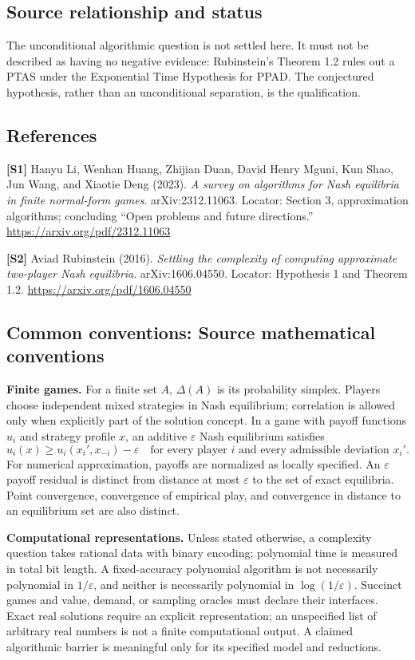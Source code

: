 \documentclass[11pt,a4paper]{article}
\begin{document}
\subsection*{Source relationship and status}
The unconditional algorithmic question is not settled here. It must not be described as having no negative evidence: Rubinstein's Theorem 1.2 rules out a PTAS under the Exponential Time Hypothesis for PPAD. The conjectured hypothesis, rather than an unconditional separation, is the qualification.
\subsection*{References}
\begingroup\footnotesize\raggedright
{\footnotesize\raggedright
\textbf{[S1]} Hanyu Li, Wenhan Huang, Zhijian Duan, David Henry Mguni, Kun Shao, Jun Wang, and Xiaotie Deng (2023). \emph{A survey on algorithms for Nash equilibria in finite normal-form games}. arXiv:2312.11063. Locator: Section 3, approximation algorithms; concluding ``Open problems and future directions.'' \url{https://arxiv.org/pdf/2312.11063}\par
\textbf{[S2]} Aviad Rubinstein (2016). \emph{Settling the complexity of computing approximate two-player Nash equilibria}. arXiv:1606.04550. Locator: Hypothesis 1 and Theorem 1.2. \url{https://arxiv.org/pdf/1606.04550}\par}
\par\endgroup

\subsection*{Common conventions: Source mathematical conventions}

\textbf{Finite games.} For a finite set $A$, $\Delta(A)$ is its probability
simplex. Players choose independent mixed strategies in Nash equilibrium;
correlation is allowed only when explicitly part of the solution concept.
In a game with payoff functions $u_i$ and strategy profile $x$, an additive
$\varepsilon$ Nash equilibrium satisfies
\[
 u_i(x)\geq u_i(x_i',x_{-i})-\varepsilon
 \quad\text{for every player $i$ and every admissible deviation $x_i'$}.
\]
For numerical approximation, payoffs are normalized as locally specified.
An $\varepsilon$ payoff residual is distinct from distance at most
$\varepsilon$ to the set of exact equilibria. Point convergence, convergence
of empirical play, and convergence in distance to an equilibrium set are
also distinct.

\textbf{Computational representations.} Unless stated otherwise, a complexity
question takes rational data with binary encoding; polynomial time is measured
in total bit length. A fixed-accuracy polynomial algorithm is not necessarily
polynomial in $1/\varepsilon$, and neither is necessarily polynomial in
$\log(1/\varepsilon)$. Succinct games and value, demand, or sampling oracles
must declare their interfaces. Exact real solutions require an explicit
representation; an unspecified list of arbitrary real numbers is not a
finite computational output. A claimed algorithmic barrier is meaningful
only for its specified model and reductions.
\end{document}
